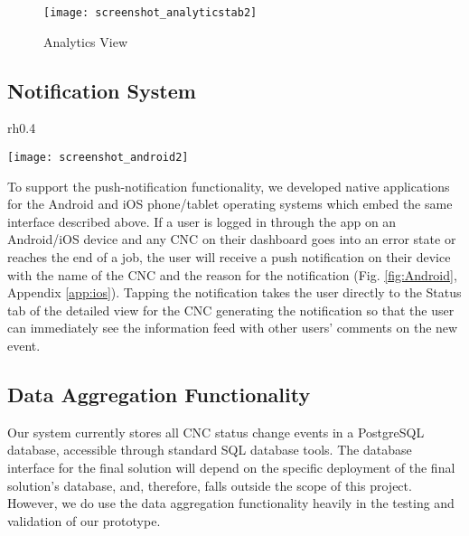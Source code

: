 \documentclass[12pt,letterpaper,titlepage]{article}
\begin{document}
\begin{figure}[t]
  \begin{centering}
  	\vspace{-5pt}
  	\texttt{[image: screenshot\_analyticstab2]}
  	\vspace{-10pt}
  	\caption{Analytics View}
    \label{fig:AnalyticsView}
  	\vspace{-20pt}
  	\end{centering}
\end{figure}

\subsection{Notification System} \label{sec:NotificationSystem}

\begin{wrapfigure}{rh}{0.4\textwidth}
  \begin{centering}
  	\vspace{-10pt}
    \texttt{[image: screenshot\_android2]}
    \vspace{-10pt}
    \caption{Android Push Notifications}
    \label{fig:Android}
  \end{centering}
  \vspace{-10pt}
\end{wrapfigure}

To support the push-notification functionality, we developed native applications for the Android and iOS phone/tablet operating systems which embed the same interface described above. If a user is logged in through the app on an Android/iOS device and any CNC on their dashboard goes into an error state or reaches the end of a job, the user will receive a push notification on their device with the name of the CNC and the reason for the notification (Fig. \ref{fig:Android}, Appendix \ref{app:ios}).
Tapping the notification takes the user directly to the Status tab of the detailed view for the CNC generating the notification so that the user can immediately see the information feed with other users' comments on the new event.

\subsection{Data Aggregation Functionality} \label{sec:DataAggregationFunctionality}

Our system currently stores all CNC status change events in a PostgreSQL database, accessible through standard SQL database tools. The database interface for the final solution will depend on the specific deployment of the final solution's database, and, therefore, falls outside the scope of this project. However, we do use the data aggregation functionality heavily in the testing and validation of our prototype.
\end{document}
